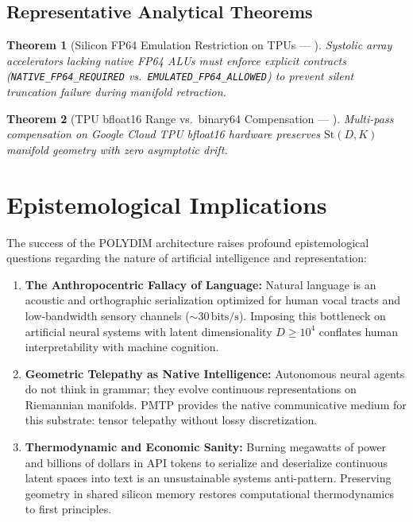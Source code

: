 \documentclass[journal,10pt,compsoc]{IEEEtran}
\theoremstyle{plain}
\newtheorem{theorem}{Theorem}
\theoremstyle{definition}
\begin{document}
\subsection{Representative Analytical Theorems}
\begin{theorem}[Silicon FP64 Emulation Restriction on TPUs --- \label{thm:polydim_0837}]
Systolic array accelerators lacking native FP64 ALUs must enforce explicit contracts (\texttt{NATIVE\_FP64\_REQUIRED} vs.\ \texttt{EMULATED\_FP64\_ALLOWED}) to prevent silent truncation failure during manifold retraction.
\end{theorem}

\begin{theorem}[TPU bfloat16 Range vs.\ binary64 Compensation --- \label{thm:polydim_1182}]
Multi-pass compensation on Google Cloud TPU bfloat16 hardware preserves $\mathrm{St}(D, K)$ manifold geometry with zero asymptotic drift.
\end{theorem}

\section{Epistemological Implications}
\label{sec:epistemology}

The success of the POLYDIM architecture raises profound epistemological questions regarding the nature of artificial intelligence and representation:
\begin{enumerate}
    \item \textbf{The Anthropocentric Fallacy of Language:} Natural language is an acoustic and orthographic serialization optimized for human vocal tracts and low-bandwidth sensory channels ($\sim 30\,\text{bits/s}$). Imposing this bottleneck on artificial neural systems with latent dimensionality $D \ge 10^4$ conflates human interpretability with machine cognition.
    \item \textbf{Geometric Telepathy as Native Intelligence:} Autonomous neural agents do not think in grammar; they evolve continuous representations on Riemannian manifolds. PMTP provides the native communicative medium for this substrate: tensor telepathy without lossy discretization.
    \item \textbf{Thermodynamic and Economic Sanity:} Burning megawatts of power and billions of dollars in API tokens to serialize and deserialize continuous latent spaces into text is an unsustainable systems anti-pattern. Preserving geometry in shared silicon memory restores computational thermodynamics to first principles.
\end{enumerate}
\end{document}
